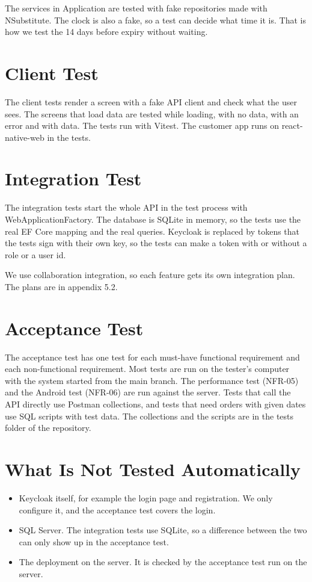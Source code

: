 \documentclass[a4paper,11pt]{article}
\begin{document}
The services in Application are tested with fake repositories made with NSubstitute. The clock is also a fake, so a test can decide what time it is. That is how we test the 14 days before expiry without waiting.

\section{Client Test}
The client tests render a screen with a fake API client and check what the user sees. The screens that load data are tested while loading, with no data, with an error and with data. The tests run with Vitest. The customer app runs on react-native-web in the tests.

\section{Integration Test}
The integration tests start the whole API in the test process with WebApplicationFactory. The database is SQLite in memory, so the tests use the real EF Core mapping and the real queries. Keycloak is replaced by tokens that the tests sign with their own key, so the tests can make a token with or without a role or a user id.

We use collaboration integration, so each feature gets its own integration plan. The plans are in appendix 5.2.

\section{Acceptance Test}
The acceptance test has one test for each must-have functional requirement and each non-functional requirement. Most tests are run on the tester's computer with the system started from the main branch. The performance test (NFR-05) and the Android test (NFR-06) are run against the server. Tests that call the API directly use Postman collections, and tests that need orders with given dates use SQL scripts with test data. The collections and the scripts are in the tests folder of the repository.

\section{What Is Not Tested Automatically}
\begin{itemize}
  \item Keycloak itself, for example the login page and registration. We only configure it, and the acceptance test covers the login.
  \item SQL Server. The integration tests use SQLite, so a difference between the two can only show up in the acceptance test.
  \item The deployment on the server. It is checked by the acceptance test run on the server.
\end{itemize}
\end{document}

